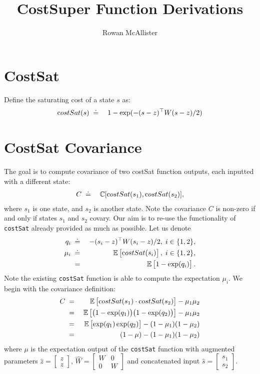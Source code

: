 \documentclass[a4paper,10pt]{article}
\title{CostSuper Function Derivations}
\author{Rowan McAllister}
\newcommand{\sqb}[1]{\begin{bmatrix}#1\end{bmatrix}}
\newcommand{\C}{\mathbb{C}}
\newcommand{\E}{\mathbb{E}}
\begin{document}
\maketitle

\section{CostSat}

Define the saturating cost of a state $s$ as:
\begin{eqnarray}
 {\text costSat}(s) \;&\doteq&\; 1 - \exp(-(s-z)^\top W(s-z)/2)
\end{eqnarray}

\section{CostSat Covariance}

The goal is to compute covariance of two {\text costSat} function outputs,
each inputted with a different state:
\begin{eqnarray}
C \;& \doteq&\; \C[{\text costSat}(s_1), {\text costSat}(s_2)],
\end{eqnarray}
where $s_1$ is one state, and $s_2$ is another state.
Note the covariance $C$ is non-zero if and only if states $s_1$ and $s_2$
covary.
%
Our aim is to re-use the functionality of {\tt costSat} already provided as
much as possible. Let us denote
\begin{eqnarray}
q_i \;& \doteq&\; -(s_i-z)^\top W(s_i-z)/2, \; i \in \{1,2\}, \\
\mu_i \;& \doteq&\; \E\sqb{{\text costSat}(s_i)}, \; i \in \{1,2\}, \\
      \;& =&\;      \E\sqb{1- \exp(q_i)}.
\end{eqnarray}
Note the existing {\tt costSat} function is able to compute the expectation
$\mu_i$.
We begin with the covariance definition:
\begin{eqnarray}
 C \;&=&\; \E\sqb{{\text costSat}(s_1)\cdot{\text costSat}(s_2)} - \mu_1 \mu_2
\\
   \;&=&\; \E\sqb{\big( 1-\exp(q_1)\big) \big( 1-\exp(q_2)\big)}-\mu_1\mu_2 \\
   \;&=&\; \E\sqb{\exp(q_1)\exp(q_2)} - (1-\mu_1)(1-\mu_2) \\
   \;&=&\; (1-\mu) - (1-\mu_1)(1-\mu_2)
\end{eqnarray}
where $\mu$ is the expectation output of the {\tt costSat} function
with augmented parameters $\hat{z} = \sqb{z\\z}$, $\hat{W} = \sqb{W & 0 \\ 0 &
W}$ and concatenated input $\hat{s} = \sqb{s_1\\s_2}$.
\end{document}
